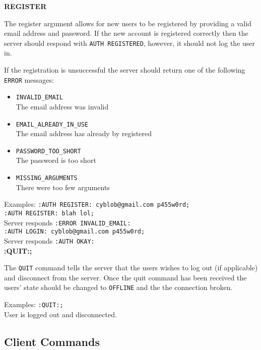 {\bf REGISTER}

The register argument allows for new users to be registered by providing a valid email address and password. If the new account is registered correctly then the server should respond with \texttt{AUTH REGISTERED}, however, it should not log the user in. 

If the registration is unsuccessful the server should return one of the following \texttt{ERROR} messages:

\begin{itemize}

\item{\texttt{INVALID\_EMAIL} \\
The email address was invalid}

\item{\texttt{EMAIL\_ALREADY\_IN\_USE} \\
The email address has already by registered}

\item{\texttt{PASSWORD\_TOO\_SHORT} \\
The password is too short}

\item{\texttt{MISSING\_ARGUMENTS}	\\
There were too few arguments}

\end{itemize}

Examples:
\texttt{:AUTH REGISTER: cyblob@gmail.com p455w0rd;} \\
\texttt{:AUTH REGISTER: blah lol;} \\
Server responds \texttt{:ERROR INVALID\_EMAIL:} \\
\texttt{:AUTH LOGIN: cyblob@gmail.com p455w0rd;}\\
Server responds \texttt{:AUTH OKAY:} \\

{\bf :QUIT:;}

The \texttt{QUIT} command tells the server that the users wishes to log out (if applicable) and disconnect from the server. Once the quit command has been received the users’ state should be changed to \texttt{OFFLINE} and the the connection broken.

Examples:
\texttt{:QUIT:;} \\
User is logged out and disconnected.

\subsection{Client Commands}

